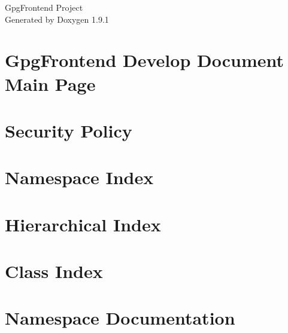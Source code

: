 \let\mypdfximage\pdfximage\def\pdfximage{\immediate\mypdfximage}\documentclass[twoside]{book}
\newcommand{\+}{\discretionary{\mbox{\scriptsize$\hookleftarrow$}}{}{}}
\newcommand{\clearemptydoublepage}{%
  \newpage{\pagestyle{empty}\cleardoublepage}%
}
\begin{document}
\raggedbottom

\hypersetup{pageanchor=false,
             bookmarksnumbered=true,
             pdfencoding=unicode
            }
\begin{titlepage}
\vspace*{7cm}
\begin{center}%
{\Large Gpg\+Frontend Project }\\
\vspace*{1cm}
{\large Generated by Doxygen 1.9.1}\\
\end{center}
\end{titlepage}
\clearemptydoublepage
{}
\tableofcontents
\clearemptydoublepage
{}
\hypersetup{pageanchor=true}

\chapter{Gpg\+Frontend Develop Document Main Page}
\label{index}\hypertarget{index}{}
\chapter{Security Policy}
\label{md_src_SECURITY}

\chapter{Namespace Index}

\chapter{Hierarchical Index}

\chapter{Class Index}

\chapter{Namespace Documentation}




\end{document}
